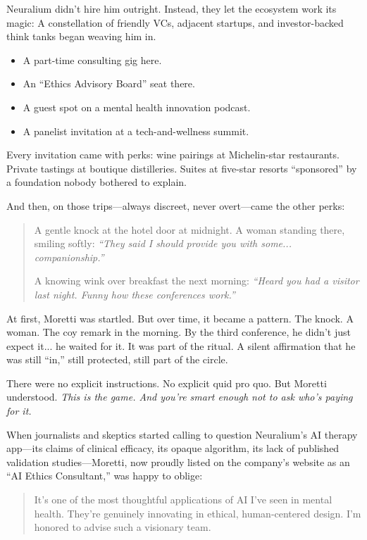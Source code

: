Neuralium didn’t hire him outright. Instead, they let the ecosystem work its magic:  
A constellation of friendly VCs, adjacent startups, and investor-backed think tanks began weaving him in.

\begin{itemize}
  \item A part-time consulting gig here.
  \item An ``Ethics Advisory Board'' seat there.
  \item A guest spot on a mental health innovation podcast.
  \item A panelist invitation at a tech-and-wellness summit.
\end{itemize}

Every invitation came with perks: wine pairings at Michelin-star restaurants. Private tastings at boutique distilleries. Suites at five-star resorts ``sponsored'' by a foundation nobody bothered to explain.

And then, on those trips—always discreet, never overt—came the other perks:

\begin{quote}
A gentle knock at the hotel door at midnight.  
A woman standing there, smiling softly: \textit{``They said I should provide you with some... companionship.''}

A knowing wink over breakfast the next morning:  
\textit{``Heard you had a visitor last night. Funny how these conferences work.''}
\end{quote}

At first, Moretti was startled. But over time, it became a pattern. The knock. A woman. The coy remark in the morning.  
By the third conference, he didn’t just expect it... he waited for it.  
It was part of the ritual. A silent affirmation that he was still ``in,'' still protected, still part of the circle.

There were no explicit instructions. No explicit quid pro quo. But Moretti understood.  
\textit{This is the game. And you’re smart enough not to ask who’s paying for it.}

When journalists and skeptics started calling to question Neuralium’s AI therapy app—its claims of clinical efficacy, its opaque algorithm, its lack of published validation studies—Moretti, now proudly listed on the company’s website as an ``AI Ethics Consultant,'' was happy to oblige:

\begin{quote}
It’s one of the most thoughtful applications of AI I’ve seen in mental health. They’re genuinely innovating in ethical, human-centered design. I’m honored to advise such a visionary team.
\end{quote}

